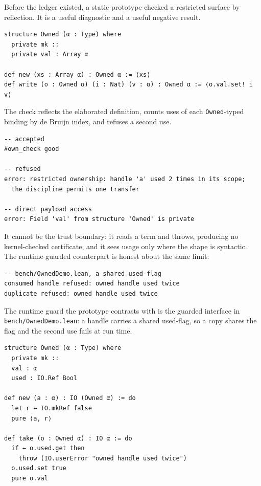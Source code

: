 \documentclass[10pt,a4paper]{article}
\newcommand{\file}[1]{\texttt{\small #1}}
\begin{document}
Before the ledger existed, a static prototype checked a restricted surface by
reflection. It is a useful diagnostic and a useful negative result.

\begin{lstlisting}[caption={\file{bench/OwnedStatic.lean}: private payload, one-transfer check.}]
structure Owned (α : Type) where
  private mk ::
  private val : Array α

def new (xs : Array α) : Owned α := ⟨xs⟩
def write (o : Owned α) (i : Nat) (v : α) : Owned α := ⟨o.val.set! i v⟩
\end{lstlisting}

The check reflects the elaborated definition, counts uses of each
\texttt{Owned}-typed binding by de Bruijn index, and refuses a second use.

\begin{lstlisting}[style=out]
-- accepted
#own_check good

-- refused
error: restricted ownership: handle 'a' used 2 times in its scope;
  the discipline permits one transfer

-- direct payload access
error: Field 'val' from structure 'Owned' is private
\end{lstlisting}

It cannot be the trust boundary: it reads a term and throws, producing no
kernel-checked certificate, and it sees usage only where the shape is syntactic.
The runtime-guarded counterpart is honest about the same limit:

\begin{lstlisting}[style=out]
-- bench/OwnedDemo.lean, a shared used-flag
consumed handle refused: owned handle used twice
duplicate refused: owned handle used twice
\end{lstlisting}

The runtime guard the prototype contrasts with is the guarded interface in
\file{bench/OwnedDemo.lean}: a handle carries a shared used-flag, so a copy shares
the flag and the second use fails at run time.

\begin{lstlisting}[caption={\file{bench/OwnedDemo.lean}: dynamic enforcement.}]
structure Owned (α : Type) where
  private mk ::
  val : α
  used : IO.Ref Bool

def new (a : α) : IO (Owned α) := do
  let r ← IO.mkRef false
  pure ⟨a, r⟩

def take (o : Owned α) : IO α := do
  if ← o.used.get then
    throw (IO.userError "owned handle used twice")
  o.used.set true
  pure o.val
\end{lstlisting}
\end{document}
